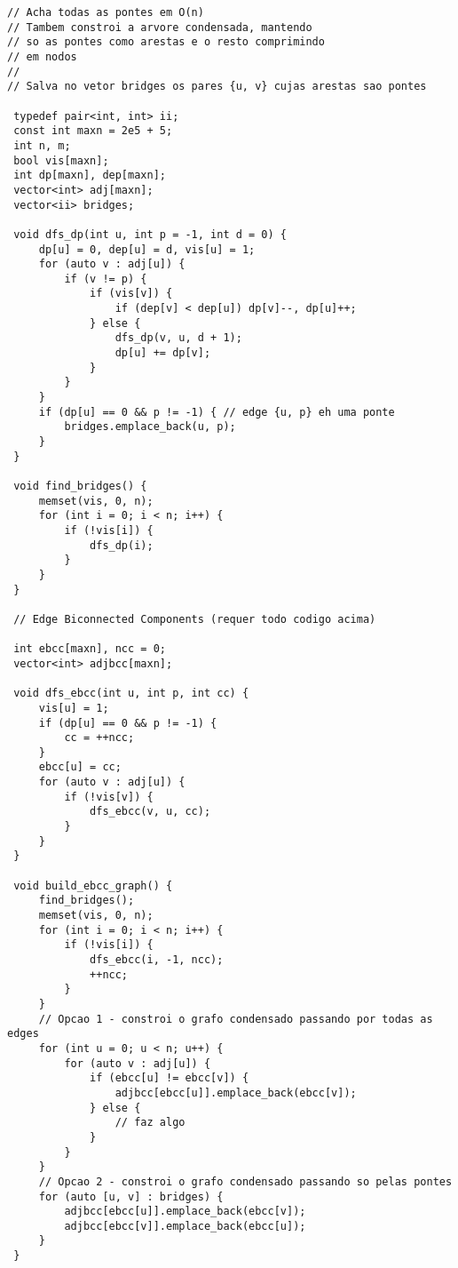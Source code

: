 \documentclass[11pt, a4paper, twoside]{article}
\begin{document}
\begin{lstlisting}
// Acha todas as pontes em O(n)
// Tambem constroi a arvore condensada, mantendo
// so as pontes como arestas e o resto comprimindo
// em nodos
//
// Salva no vetor bridges os pares {u, v} cujas arestas sao pontes

 typedef pair<int, int> ii;
 const int maxn = 2e5 + 5;
 int n, m;
 bool vis[maxn];
 int dp[maxn], dep[maxn];
 vector<int> adj[maxn];
 vector<ii> bridges;
 
 void dfs_dp(int u, int p = -1, int d = 0) {
     dp[u] = 0, dep[u] = d, vis[u] = 1;
     for (auto v : adj[u]) {
         if (v != p) {
             if (vis[v]) {
                 if (dep[v] < dep[u]) dp[v]--, dp[u]++;
             } else {
                 dfs_dp(v, u, d + 1);
                 dp[u] += dp[v];
             }
         }
     }
     if (dp[u] == 0 && p != -1) { // edge {u, p} eh uma ponte
         bridges.emplace_back(u, p);
     }
 }
 
 void find_bridges() {
     memset(vis, 0, n);
     for (int i = 0; i < n; i++) {
         if (!vis[i]) {
             dfs_dp(i);
         }
     }
 }
 
 // Edge Biconnected Components (requer todo codigo acima)
 
 int ebcc[maxn], ncc = 0;
 vector<int> adjbcc[maxn];
 
 void dfs_ebcc(int u, int p, int cc) {
     vis[u] = 1;
     if (dp[u] == 0 && p != -1) {
         cc = ++ncc;
     }
     ebcc[u] = cc;
     for (auto v : adj[u]) {
         if (!vis[v]) {
             dfs_ebcc(v, u, cc);
         }
     }
 }
 
 void build_ebcc_graph() {
     find_bridges();
     memset(vis, 0, n);
     for (int i = 0; i < n; i++) {
         if (!vis[i]) {
             dfs_ebcc(i, -1, ncc);
             ++ncc;
         }
     }
     // Opcao 1 - constroi o grafo condensado passando por todas as edges
     for (int u = 0; u < n; u++) {
         for (auto v : adj[u]) {
             if (ebcc[u] != ebcc[v]) {
                 adjbcc[ebcc[u]].emplace_back(ebcc[v]);
             } else {
                 // faz algo
             }
         }
     }
     // Opcao 2 - constroi o grafo condensado passando so pelas pontes
     for (auto [u, v] : bridges) {
         adjbcc[ebcc[u]].emplace_back(ebcc[v]);
         adjbcc[ebcc[v]].emplace_back(ebcc[u]);
     }
 }
\end{lstlisting}
\end{document}
